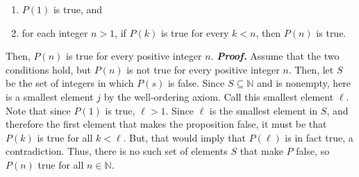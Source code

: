 \documentclass{report}
\begin{document}
\begin{itemize}
            \begin{enumerate}
                \item $P(1)$ is true, and
                \item for each integer $n>1$, if $P(k)$ is true for every $k<n$, then $P(n)$ is true.
            \end{enumerate}
            Then, $P(n)$ is true for every positive integer $n$.
            \bigbreak \noindent 
            \textbf{\textit{Proof.}} Assume that the two conditions hold, but $P(n)$ is not true for every positive integer $n$. Then, let $S$ be the set of integers in which $P(s)$ is false. Since $S \subseteq \mathbb{N}$ and is nonempty, here is a smallest element $j$ by the well-ordering axiom. Call this smallest element $\ell$.
            \bigbreak \noindent 
            Note that since $P(1)$ is true, $\ell > 1$. Since $\ell$ is the smallest element in $S$, and therefore the first element that makes the proposition false, it must be that $P(k)$ is true for all $k < \ell$. But, that would imply that $P(\ell)$ is in fact true, a contradiction.
            \bigbreak \noindent 
            Thus, there is no such set of elements $S$ that make $P$ false, so $P(n)$ true for all $n \in \mathbb{N}$.
    \end{itemize}

    \pagebreak 
\end{document}
